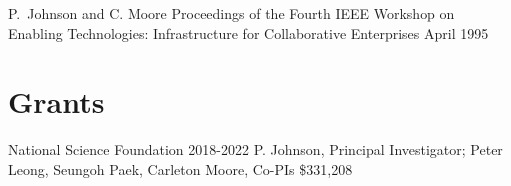 \documentclass[11pt,letterpaper,sans]{moderncv} %
\begin{document}
          {P.~Johnson and C. Moore}
          {Proceedings of the Fourth IEEE Workshop on Enabling Technologies: Infrastructure for Collaborative Enterprises}
          {April 1995}


\section{Grants}

        {National Science Foundation} %
        {2018-2022} %
        {P. Johnson, Principal Investigator; Peter Leong, Seungoh Paek, Carleton Moore, Co-PIs}  %
        {\$331,208} %


\end{document}
